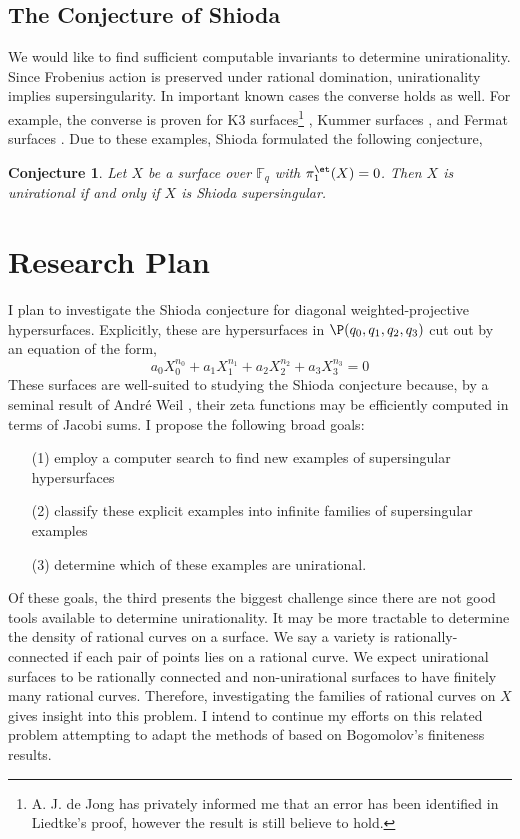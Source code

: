 \documentclass[12pt]{amsart}
\newtheorem*{conj}{Conjecture}
\begin{document}
\subsection*{The Conjecture of Shioda}

We would like to find sufficient computable invariants to determine unirationality. Since Frobenius action is preserved under rational domination, unirationality implies supersingularity. In important known cases the converse holds as well. For example, the converse is proven for K3 surfaces\footnote{A. J. de Jong has privately informed me that an error has been identified in Liedtke's proof, however the result is still believe to hold.} \cite{liedtke}, Kummer surfaces \cite{shioda_some_results},  and Fermat surfaces \cite{shioda_on_fermat}. Due to these examples, Shioda formulated \cite{shioda_some_results} the following conjecture,
\begin{conj}
Let $X$ be a surface over $\mathbb{F}_q$ with $\pi_1^{\et}(X) = 0$. Then $X$ is unirational if and only if $X$ is Shioda supersingular.
\end{conj}

\section*{Research Plan}

I plan to investigate the Shioda conjecture for diagonal weighted-projective hypersurfaces. Explicitly, these are hypersurfaces in $\P(q_0, q_1, q_2, q_3)$ cut out by an equation of the form,
\[ a_0 X_0^{n_0} + a_1 X_1^{n_1} + a_2 X_2^{n_2} + a_3 X_3^{n_3} = 0 \]
These surfaces are well-suited to studying the Shioda conjecture because, by a seminal result of Andr\'{e} Weil \cite{weil_counting}, their zeta functions may be efficiently computed in terms of Jacobi sums. I propose the following broad goals:
\begin{enumerate}
\item[(1)] employ a computer search to find new examples of supersingular hypersurfaces
\item[(2)] classify these explicit examples into infinite families of supersingular examples
\item[(3)] determine which of these examples are unirational.
\end{enumerate}
Of these goals, the third presents the biggest challenge since there are not good tools available to determine unirationality. It may be more tractable to determine the density of rational curves on a surface. We say a variety is rationally-connected if each pair of points lies on a rational curve. We expect unirational surfaces to be rationally connected and non-unirational surfaces to have finitely many rational curves. Therefore, investigating the families of rational curves on $X$ gives insight into this problem. I intend to continue my efforts on this related problem attempting to adapt the methods of \cite{lang} based on Bogomolov's finiteness results.
\end{document}
